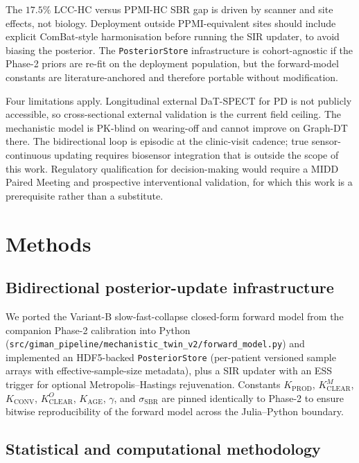 The $17.5\%$ LCC-HC versus PPMI-HC SBR gap is driven by scanner and site effects, not biology. Deployment outside PPMI-equivalent sites should include explicit ComBat-style harmonisation\cite{wakasugi2024combat} before running the SIR updater, to avoid biasing the posterior. The \texttt{PosteriorStore} infrastructure is cohort-agnostic if the Phase-2 priors are re-fit on the deployment population, but the forward-model constants are literature-anchored and therefore portable without modification.

Four limitations apply. Longitudinal external DaT-SPECT for PD is not publicly accessible, so cross-sectional external validation is the current field ceiling. The mechanistic model is PK-blind on wearing-off and cannot improve on Graph-DT there. The bidirectional loop is episodic at the clinic-visit cadence; true sensor-continuous updating requires biosensor integration that is outside the scope of this work. Regulatory qualification for decision-making would require a MIDD Paired Meeting and prospective interventional validation, for which this work is a prerequisite rather than a substitute.

\section{Methods}

\subsection{Bidirectional posterior-update infrastructure}

We ported the Variant-B slow-fast-collapse closed-form forward model from the companion Phase-2 calibration\cite{dupre2026paper7} into Python (\texttt{src/giman\_pipeline/mechanistic\_twin\_v2/forward\_model.py}) and implemented an HDF5-backed \texttt{PosteriorStore} (per-patient versioned sample arrays with effective-sample-size metadata), plus a SIR updater with an ESS trigger for optional Metropolis--Hastings rejuvenation. Constants $K_\text{PROD}$, $K_\text{CLEAR}^M$, $K_\text{CONV}$, $K_\text{CLEAR}^O$, $K_\text{AGE}$, $\gamma$, and $\sigma_\text{SBR}$ are pinned identically to Phase-2 to ensure bitwise reproducibility of the forward model across the Julia--Python boundary.

\subsection{Statistical and computational methodology}

